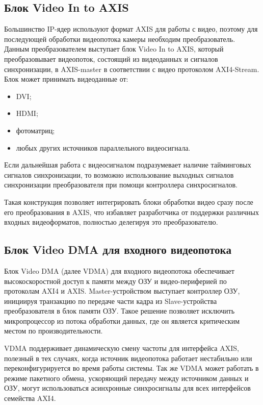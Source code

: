\subsection{Блок Video In to AXIS}
\label{sec:structural:video_in_to_axis}
Большинство IP-ядер используют формат AXIS для работы с видео, поэтому для последующей обработки
видеопотока камеры необходим преобразователь. Данным преобразователем выступает блок Video In to AXIS,
который преобразовывает видеопоток, состоящий из видеоданных и сигналов синхронизации, в
AXIS-master в соответствии с видео протоколом AXI4-Stream. Блок может принимать
видеоданные от:
\begin{itemize}
  \item DVI;
  \item HDMI;
  \item фотоматриц;
  \item любых других источников параллельного видеосигнала.
\end{itemize}

Если дальнейшая работа с видеосигналом подразумевает наличие тайминговых сигналов синхронизации,
то возможно использование выходных сигналов синхронизации преобразователя при помощи контроллера
синхросигналов.

Такая конструкция позволяет интегрировать блоки обработки видео сразу после его преобразования в AXIS,
что избавляет разработчика от поддержки различных входных видеоформатов, полностью делегируя это преобразователю.

\subsection{Блок Video DMA для входного видеопотока}
\label{sec:structural:vdma_in}
Блок Video DMA (далее VDMA) для входного видеопотока обеспечивает высокоскоростной доступ к памяти
между ОЗУ и видео-периферией по протоколам AXI4 и AXIS. Master-устройством выступает контроллер ОЗУ,
инициируя транзакцию по передаче части кадра из Slave-устройства преобразователя в блок памяти ОЗУ.
Такое решение позволяет исключить микропроцессор из потока обработки данных, где он является
критическим местом по производительности.

VDMA поддерживает динамическую смену частоты для интерфейса AXIS, полезный в тех случаях,
когда источник видеопотока работает нестабильно или переконфигурируется во время работы системы.
Так же VDMA может работать в режиме пакетного обмена, ускоряющий передачу между источником данных и ОЗУ,
могут использоваться асинхронные синхросигналы для всех интерфейсов семейства AXI4.

